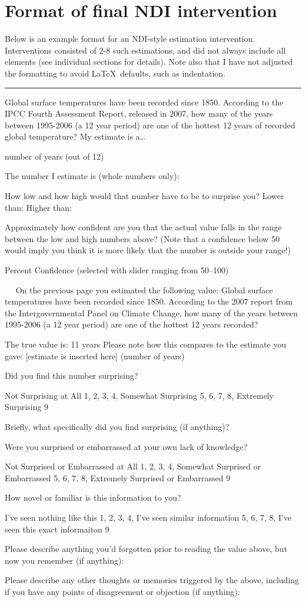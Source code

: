 \chapter{Format of final NDI intervention}
\label{app:format-ndi}

Below is an example format for an NDI-style estimation intervention.
Interventions consisted of 2-8 such estimations, and did not always include all
elements (see individual sections for details). Note also that I have not
adjusted the formatting to avoid \LaTeX\ defaults, such as indentation. 
\hrule
Global surface temperatures have been recorded since 1850. According to the IPCC
Fourth Assessment Report, released in 2007, how many of the years between
1995-2006 (a 12 year period) are one of the hottest 12 years of recorded global
temperature? My estimate is a…

number of years (out of 12)

The number I estimate is (whole numbers only):

How low and how high would that number have to be to surprise you?
Lower than: 
Higher than:

Approximately how confident are you that the actual value falls in the range
between the low and high numbers above? (Note that a confidence below 50 would
imply you think it is more likely that the number is outside your range!)

\underline{\hspace{3cm}} Percent Confidence (selected with slider ranging from
50–100)

 
On the previous page you estimated the following value:  Global surface
temperatures have been recorded since 1850. According to the 2007 report from
the Intergovernmental Panel on Climate Change, how many of the years between
1995-2006 (a 12 year period) are one of the hottest 12 years recorded?

The true value is: 11 years  Please note how this compares to the estimate you
gave: [estimate is inserted here] (number of years)

Did you find this number surprising?

Not Surprising at All 1, 2, 3, 4, Somewhat Surprising 5, 6, 7, 8, Extremely
Surprising 9

Briefly, what specifically did you find surprising (if anything)?

Were you surprised or embarrassed at your own lack of knowledge?

Not Surprised or Embarrassed at All 1, 2, 3, 4, Somewhat Surprised or
Embarrassed 5, 6, 7, 8, Extremely Surprised or Embarrassed 9

How novel or familiar is this information to you?

I've seen nothing like this 1, 2, 3, 4, I've seen similar information 5, 6, 7,
8, I've seen this exact informaiton 9 

Please describe anything you'd forgotten prior to reading the value above, but
now you remember (if anything):

Please describe any other thoughts or memories triggered by the above, including
if you have any points of disagreement or objection (if anything):
